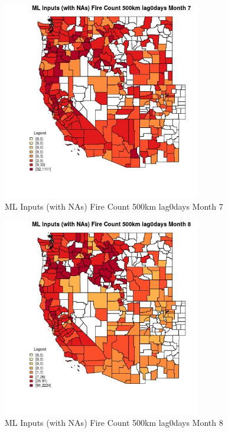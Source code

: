 \begin{figure} 
\centering  
\includegraphics[width=0.77\textwidth]{Code_Outputs/Report_ML_input_PM25_Step4_part_e_de_duplicated_aves_compiled_2019-05-21wNAs_CountyFire_Count_500km_lag0daysmedianMonth7.jpg} 
\caption{\label{fig:Report_ML_input_PM25_Step4_part_e_de_duplicated_aves_compiled_2019-05-21wNAsCountyFire_Count_500km_lag0daysmedianMonth7}ML Inputs (with NAs) Fire Count 500km lag0days Month 7} 
\end{figure} 
 

\begin{figure} 
\centering  
\includegraphics[width=0.77\textwidth]{Code_Outputs/Report_ML_input_PM25_Step4_part_e_de_duplicated_aves_compiled_2019-05-21wNAs_CountyFire_Count_500km_lag0daysmedianMonth8.jpg} 
\caption{\label{fig:Report_ML_input_PM25_Step4_part_e_de_duplicated_aves_compiled_2019-05-21wNAsCountyFire_Count_500km_lag0daysmedianMonth8}ML Inputs (with NAs) Fire Count 500km lag0days Month 8} 
\end{figure} 
 

